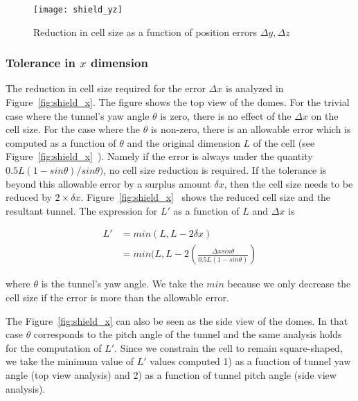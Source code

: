 \documentclass[a4paper]{report}
\begin{document}
\begin{figure}[ht]
\centering
 \texttt{[image: shield\_yz]}
\caption{Reduction in cell size as a function of position errors $\Delta y, \Delta z$}
\label{fig:shield_yz}
\end{figure}

\subsubsection{Tolerance in $x$ dimension}
The reduction in cell size required for the error $\Delta x$ is analyzed in Figure~\ref{fig:shield_x}. The figure shows the top view of the domes. For the trivial case where the tunnel's yaw angle $\theta$ is zero, there is no effect of the $\Delta x$ on the cell size. 
For the case where the $\theta$ is non-zero, there is an allowable error which is computed as a function of $\theta$ and the original dimension $L$ of the cell (see Figure~\ref{fig:shield_x}~). Namely if the error is always under the quantity $0.5L(1 -sin \theta) / sin \theta)$, no cell size reduction is required.
If the tolerance is beyond this allowable error by a surplus amount $\delta x$, then the cell size needs to be reduced by $2 \times \delta x$. Figure~\ref{fig:shield_x}~ shows the reduced cell size and the resultant tunnel. The expression for $L'$ as a function of $L$ and $\Delta x$ is

\begin{equation} \label{eq1}
\begin{split}
L' & = min(L, L - 2 \delta x) \\
   & = min(L, L - 2(\frac{\Delta x sin \theta} {0.5L (1 - sin \theta)})
\end{split}
\end{equation}

where $\theta$ is the tunnel's yaw angle. We take the $min$ because we only decrease the cell size if the error is more than the allowable error.

The Figure~\ref{fig:shield_x} can also be seen as the side view of the domes. In that case $\theta$ corresponds to the pitch angle of the tunnel and the same analysis holds for the computation of $L'$.
%
Since we constrain the cell to remain square-shaped, we take the minimum value of $L'$ values computed 1) as a function of tunnel yaw angle (top view analysis) and 2) as a function of tunnel pitch angle (side view analysis).
\end{document}
